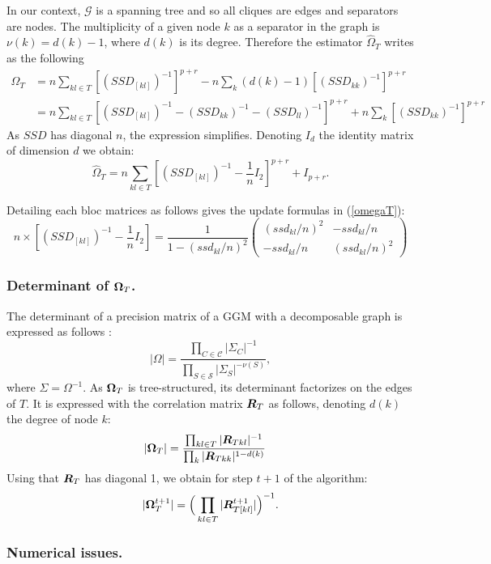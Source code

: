 In our context, $\mathcal{G}$ is a spanning tree and so all cliques are edges and separators are nodes. The multiplicity of a given node $k$ as a separator in the graph is  $\nu(k) = d(k)-1$, where $d(k)$ is its degree. Therefore the estimator  $\widehat{\Omega}_T$  writes as the following 
\begin{align*}
\widehat{\Omega}_T &= n  \sum_{kl\in T}   [(SSD_{[kl]})^{-1}]^{p+r} - n\sum_k (d(k)-1)[(SSD_{kk})^{-1}]^{p+r}\\
&=n \sum_{kl\in T}  [(SSD_{[kl]})^{-1} - (SSD_{kk})^{-1} -  (SSD_{ll})^{-1} ]^{p+r} + n\sum_k[(SSD_{kk})^{-1}]^{p+r}
\end{align*}
As $SSD$ has diagonal $n$, the expression simplifies. Denoting $I_d$ the identity matrix of dimension $d$ we obtain:
$$\widehat{\Omega}_T =n\sum_{kl\in T} [(SSD_{[kl]})^{-1} -\frac{1}{n} I_2]^{p+r}+ I_{p+r}.$$

Detailing each bloc matrices as follows gives the update formulas in (\ref{omegaT}):
\[
n\times [(SSD_{[kl]})^{-1} - \frac{1}{n}I_2] = \frac{1}{1-(ssd_{kl}/n)^2}
\left(\begin{array}{cc}
		(ssd_{kl}/n)^2   & -ssd_{kl}/n\\
		-ssd_{kl}/n& (ssd_{kl}/n)^2 
		\end{array}\right)
\]


\subsubsection[for the toc]{Determinant of ${\boldsymbol{\Omega}}_T$.}
The determinant of a precision matrix of a GGM with a decomposable graph is expressed as follows \citep{Lau96}:
$$ |\Omega| =\dfrac{\prod_{C\in \mathcal{C}} |\Sigma_C|^{-1}}{\prod_{S\in \mathcal{S}} |\Sigma_S|^{-\nu(S)}},$$
where $\Sigma = \Omega^{-1}$. As ${\boldsymbol{\Omega}}_T$ is tree-structured, its determinant factorizes on the edges of $T$. It is expressed with the correlation matrix ${\boldsymbol{R}}_T$ as follows, denoting $d(k)$ the degree of node $k$:
\begin{align*}
|{{\boldsymbol{\Omega}}}_T| &=\frac{\prod_{kl \in T} |{{\boldsymbol{R}}}_{Tkl}|^{-1}}{\prod_k |{{\boldsymbol{R}}}_{Tkk}|^{1-d(k)}} 
 \end{align*}
Using that ${\boldsymbol{R}}_T$ has diagonal 1, we obtain for step $t+1$ of the algorithm:
$$|{\boldsymbol{\Omega}}^{t+1}_{T}| = \Big(\prod_{kl \in T} |{\boldsymbol{R}}_{T[kl]}^{t+1}|\Big)^{-1}.$$


\subsubsection{Numerical issues.} \label{app:numIssues}

